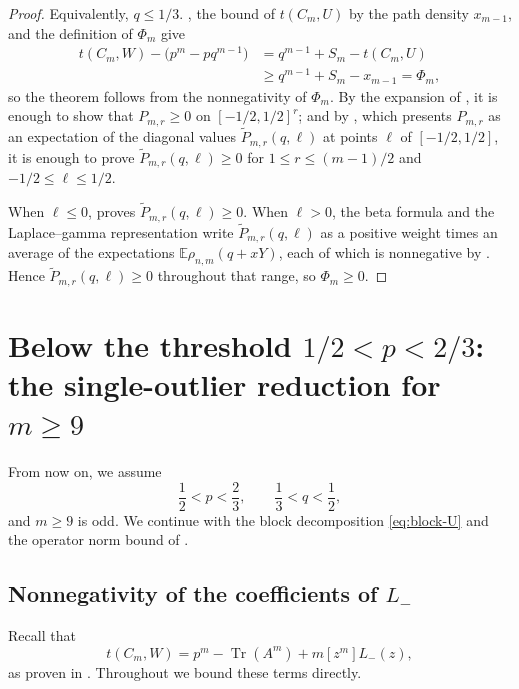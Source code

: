 \documentclass[11pt]{article}
\numberwithin{equation}{section}
\newcommand{\Tr}{\operatorname{Tr}}
\newcommand{\E}{\mathbb E}
\begin{document}
\begin{proof}
  Equivalently, $q\le1/3$.
  , the bound of $t(C_m,U)$ by the path density $x_{m-1}$, and the definition of $\Phi_m$ give
  \begin{align*}
    t(C_m,W)-\bigl(p^m-pq^{m-1}\bigr)
    &=q^{m-1}+S_m-t(C_m,U)\\
    &\ge q^{m-1}+S_m-x_{m-1}=\Phi_m,
  \end{align*}
  so the theorem follows from the nonnegativity of $\Phi_m$.
  By the expansion of , it is enough to show that $P_{m,r}\ge0$ on $[-1/2,1/2]^r$; and by , which presents $P_{m,r}$ as an expectation of the diagonal values $\widetilde P_{m,r}(q,\ell)$ at points $\ell$ of $[-1/2,1/2]$, it is enough to prove $\widetilde P_{m,r}(q,\ell)\ge0$ for $1\le r\le(m-1)/2$ and $-1/2\le\ell\le1/2$.

  When $\ell\le0$,  proves $\widetilde P_{m,r}(q,\ell)\ge0$.
  When $\ell>0$, the beta formula  and the Laplace--gamma representation  write $\widetilde P_{m,r}(q,\ell)$ as a positive weight times an average of the expectations $\E\rho_{n,m}(q+xY)$, each of which is nonnegative by .
  Hence $\widetilde P_{m,r}(q,\ell)\ge0$ throughout that range, so $\Phi_m\ge0$.
\end{proof}

\section{Below the threshold \texorpdfstring{$1/2<p<2/3$}{1/2<p<2/3}: the single-outlier reduction for \texorpdfstring{$m\ge9$}{m>=9}}
\label{sec:plt23}

From now on, we assume
\begin{equation}\label{eq:plt23-range}
  \frac{1}{2}<p<\frac{2}{3}, \qquad \frac{1}{3}<q<\frac{1}{2},
\end{equation}
and $m\ge9$ is odd.
We continue with the block decomposition \eqref{eq:block-U} and the operator norm bound of .

\subsection{Nonnegativity of the coefficients of \texorpdfstring{$L_-$}{L-}}\label{subsec:plt23-one-sided-schur}

Recall that
\begin{equation}\label{eq:plt23-one-sided-identity}
  t(C_m,W)=p^m-\Tr(A^m)+m[z^m]L_-(z),
\end{equation}
as proven in .
Throughout  we bound these terms directly.
\end{document}
